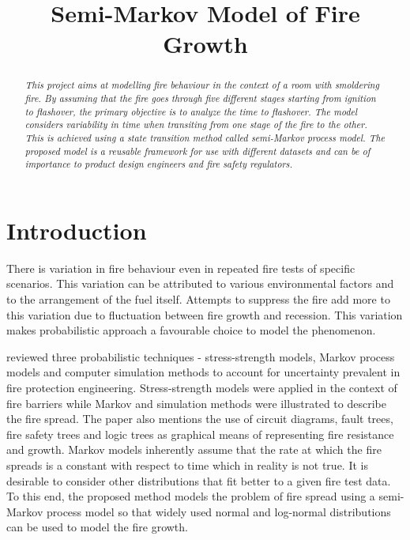 \documentclass[12pt]{asme2ej}
\title{Semi-Markov Model of Fire Growth}
\begin{document}
\maketitle    

\thispagestyle{empty}
\begin{abstract}
{\it 
This project aims at modelling fire behaviour in the context of a room with smoldering
fire. By assuming that the fire goes through five different stages starting from ignition
to flashover, the primary objective is to analyze the time to flashover. The
model considers variability in time when transiting from one stage of the fire to the
other. This is achieved using a state transition method called semi-Markov process
model. The proposed model is a reusable framework for use with different datasets and
can be of importance to product design engineers and fire safety regulators.
}
\end{abstract}



\section{Introduction}
There is variation in fire behaviour even in repeated fire tests of specific scenarios. This variation can be attributed to various environmental factors and to the arrangement of the fuel itself. Attempts to suppress the fire add more to this variation due to fluctuation between fire growth and recession. This variation makes probabilistic approach a favourable choice to model the phenomenon.


\cite{Watts1986127} reviewed three probabilistic techniques - stress-strength models, Markov process models and computer simulation methods to account for uncertainty prevalent in fire protection engineering. Stress-strength models were applied in the context of fire barriers while Markov and simulation methods were illustrated to describe the fire spread. The paper also mentions the use of circuit diagrams, fault trees, fire safety trees and logic trees as graphical means of representing fire resistance and growth. Markov models inherently assume that the rate at which the fire spreads is a constant with respect to time which in reality is not true. It is desirable to consider other distributions that fit better to a given fire test data. To this end, the proposed method models the problem of fire spread using a semi-Markov process model so that widely used normal and log-normal distributions can be used to model the fire growth.
\end{document}
